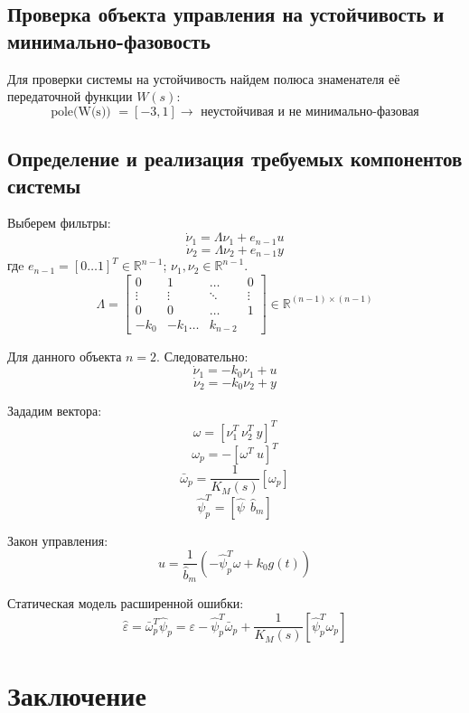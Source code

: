 \documentclass{article}
\begin{document}
\subsection{Проверка объекта управления на устойчивость и минимально-фазовость}
Для проверки системы на устойчивость найдем полюса знаменателя её передаточной функции \(W(s)\):
\[\text{pole(W(s)) } = [-3, 1] \rightarrow \text{ неустойчивая и не минимально-фазовая}\]

\subsection{Определение и реализация требуемых компонентов системы}
Выберем фильтры:
\[\dot \nu_1 = \Lambda \nu_1 + e_{n-1}u\]
\[\dot \nu_2 = \Lambda \nu_2 + e_{n-1}y\]
гдe \(e_{n-1} = [0 \hdots 1]^T \in \mathds{R}^{n-1}\); \(\nu_1, \nu_2 \in \mathds{R}^{n-1}\).
\[\Lambda = \begin{bmatrix}
  0 & 1 & \hdots & 0 \\
  \vdots & \vdots & \ddots & \vdots \\
  0 & 0 & \hdots & 1 \\
  -k_0 & -k_1 \hdots & k_{n- 2}
\end{bmatrix} \in \mathds{R}^{(n-1) \times (n-1)} \]

Для данного объекта \(n=2\). Следовательно:
\[\dot \nu_1 = -k_0 \nu_1 + u\]
\[\dot \nu_2 = -k_0 \nu_2 + y\]

Зададим вектора:
\[\omega = [\nu_1^T~\nu_2^T~y]^T\]
\[\omega_p = -[\omega^T~u]^T\]
\[\bar \omega_p = \frac{1}{K_M(s)}[\omega_p]\]
\[\hat{\psi}_p^T = [\hat \psi ~~ \hat b_m] \]

Закон управления:
\[u = \frac{1}{\hat{b}_m}(-\hat{\psi}_p^T \omega + k_0 g(t)) \]

Статическая модель расширенной ошибки:
\[\hat \varepsilon = \bar \omega_p^T \hat{\psi}_p =  \varepsilon - \hat{\psi}_p^T \bar \omega_p + \frac{1}{K_M(s)}[ \hat{\psi}_p^T \omega_p]\]





\FloatBarrier



\newpage
\section{Заключение}
\end{document}
